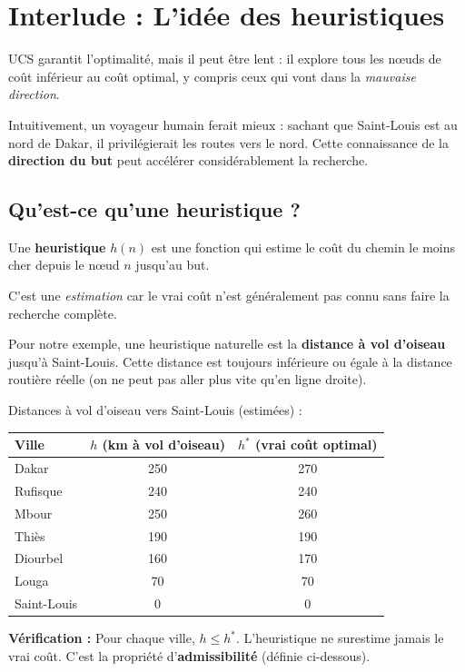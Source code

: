 \documentclass[11pt,a4paper]{article}
\begin{document}
\section{Interlude : L'idée des heuristiques}

UCS garantit l'optimalité, mais il peut être lent : il explore tous les nœuds de coût inférieur au coût optimal, y compris ceux qui vont dans la \textit{mauvaise direction}. 

Intuitivement, un voyageur humain ferait mieux : sachant que Saint-Louis est au nord de Dakar, il privilégierait les routes vers le nord. Cette connaissance de la \textbf{direction du but} peut accélérer considérablement la recherche.

\subsection{Qu'est-ce qu'une heuristique ?}

\begin{definitionbox}
Une \textbf{heuristique} $h(n)$ est une fonction qui estime le coût du chemin le moins cher depuis le nœud $n$ jusqu'au but.

C'est une \textit{estimation} car le vrai coût n'est généralement pas connu sans faire la recherche complète.
\end{definitionbox}

Pour notre exemple, une heuristique naturelle est la \textbf{distance à vol d'oiseau} jusqu'à Saint-Louis. Cette distance est toujours inférieure ou égale à la distance routière réelle (on ne peut pas aller plus vite qu'en ligne droite).

\begin{exemplebox}
Distances à vol d'oiseau vers Saint-Louis (estimées) :
\begin{center}
\begin{tabular}{lcc}
\toprule
\textbf{Ville} & $h$ (km à vol d'oiseau) & $h^*$ (vrai coût optimal) \\
\midrule
Dakar & 250 & 270 \\
Rufisque & 240 & 240 \\
Mbour & 250 & 260 \\
Thiès & 190 & 190 \\
Diourbel & 160 & 170 \\
Louga & 70 & 70 \\
Saint-Louis & 0 & 0 \\
\bottomrule
\end{tabular}
\end{center}

\textbf{Vérification :} Pour chaque ville, $h \leq h^*$. L'heuristique ne surestime jamais le vrai coût. C'est la propriété d'\textbf{admissibilité} (définie ci-dessous).
\end{exemplebox}
\end{document}
